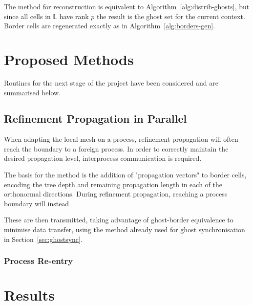 \documentclass[twoside]{IIBproject}
\numberwithin{figure}{section}
\begin{document}
            The method for reconstruction is equivalent to Algorithm~\ref{alg:distrib-ghosts}, but since all cells in $\mathbb{L}$ have rank $p$ the result is the ghost set for the current context. Border cells are regenerated exactly as in Algorithm~\ref{alg:borders-gen}.





\section{Proposed Methods} %
    \label{sec:future-work}

    Routines for the next stage of the project have been considered and are summarised below. 

    \subsection{Refinement Propagation in Parallel} %
        \label{sec:parprop}

        When adapting the local mesh on a process, refinement propagation will often reach the boundary to a foreign process. In order to correctly maintain the desired propagation level, interprocess communication is required. 

        The basis for the method is the addition of "propagation vectors" to border cells, encoding the tree depth and remaining propagation length in each of the orthonormal directions. During refinement propagation, reaching a process boundary will instead

        These are then transmitted, taking advantage of ghost-border equivalence to minimise data transfer, using the method already used for ghost synchronisation in Section~\ref{sec:ghostsync}.


        \subsubsection{Process Re-entry} %
            \label{sec:parprop-reentry}





\section{Results} %
    \label{sec:results}
\end{document}
